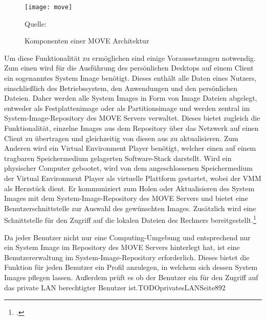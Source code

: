 \begin{figure}[H]
\begin{center}
\texttt{[image: move]}
\caption{Komponenten einer MOVE Architektur}
Quelle: \cite[Seite 891]{MOVE}
\end{center}
\end{figure}
\vspace{-1cm}

Um diese Funktionalität zu ermöglichen sind einige Voraussetzungen notwendig. Zum einen wird für die Ausführung des persönlichen Desktops auf einem Client ein sogenanntes System Image benötigt. Dieses enthält alle Daten eines Nutzers, einschließlich des Betriebssystem, den Anwendungen und den persönlichen Dateien.
Daher werden alle System Images in Form von Image Dateien abgelegt, entweder als 
Festplattenimage oder als Partitionsimage und werden zentral im System-Image-Repository des MOVE Servers verwaltet. Dieses bietet zugleich die Funktionalität, einzelne Images aus dem Repository über das Netzwerk auf einen Client zu übertragen und gleichzeitig von diesen aus zu aktualisieren. Zum Anderen wird ein Virtual Environment Player benötigt, welcher einen auf einem tragbaren Speichermedium gelagerten Software-Stack darstellt. Wird ein physischer Computer gebootet, wird von dem angeschlossenen Speichermedium der Virtual Environment Player als virtuelle Plattform gestartet, wobei der VMM als Herzstück dient. Er kommuniziert zum Holen oder Aktualisieren des System Images mit dem System-Image-Repository des MOVE Servers und bietet eine Benutzerschnittstelle zur Auswahl des gewünschten Images. Zusätzlich wird eine Schnittstelle für den Zugriff auf die lokalen Dateien des Rechners bereitgestellt.\footcite[Vgl.][Seite 892]{MOVE}

Da jeder Benutzer nicht nur eine Computing-Umgebung und entsprechend nur ein System Image im Repository des MOVE Servers hinterlegt hat, ist eine Benutzererwaltung im System-Image-Repository erforderlich. Dieses bietet die Funktion für jeden Benutzer ein Profil anzulegen, in welchem sich dessen System Images pflegen lassen. Außerdem prüft es ob der Benutzer ein für den Zugriff auf das private LAN berechtigter Benutzer ist.TODOprivatesLANSeite892